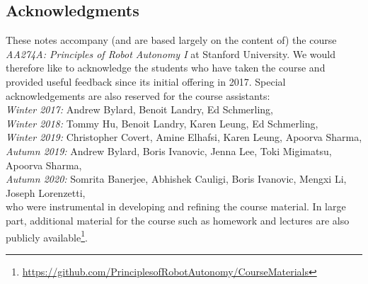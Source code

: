 \subsection*{Acknowledgments}
These notes accompany (and are based largely on the content of) the course \textit{AA274A: Principles of Robot Autonomy I} at Stanford University. We would therefore like to acknowledge the students who have taken the course and provided useful feedback since its initial offering in 2017. Special acknowledgements are also reserved for the course assistants:\\
\emph{Winter 2017:} Andrew Bylard, Benoit Landry, Ed Schmerling,\\
\emph{Winter 2018:} Tommy Hu, Benoit Landry, Karen Leung, Ed Schmerling,\\
\emph{Winter 2019:} Christopher Covert, Amine Elhafsi, Karen Leung, Apoorva Sharma,\\
\emph{Autumn 2019:} Andrew Bylard, Boris Ivanovic, Jenna Lee,  Toki Migimatsu, Apoorva Sharma,\\
\emph{Autumn 2020:} Somrita Banerjee, Abhishek Cauligi, Boris Ivanovic, Mengxi Li, Joseph Lorenzetti,\\
who were instrumental in developing and refining the course material. In large part, additional material for the course such as homework and lectures are also publicly available\footnote{\url{https://github.com/PrinciplesofRobotAutonomy/CourseMaterials}}.